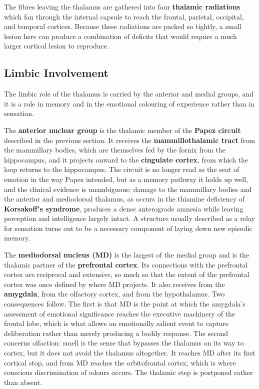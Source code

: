 \documentclass[11pt]{article}
\begin{document}
The fibres leaving the thalamus are gathered into four \textbf{thalamic radiations} which fan through the internal capsule to reach the frontal, parietal, occipital, and temporal cortices. Because these radiations are packed so tightly, a small lesion here can produce a combination of deficits that would require a much larger cortical lesion to reproduce.

\subsection{Limbic Involvement}

The limbic role of the thalamus is carried by the anterior and medial groups, and it is a role in memory and in the emotional colouring of experience rather than in sensation.

The \textbf{anterior nuclear group} is the thalamic member of the \textbf{Papez circuit} described in the previous section. It receives the \textbf{mammillothalamic tract} from the mammillary bodies, which are themselves fed by the fornix from the hippocampus, and it projects onward to the \textbf{cingulate cortex}, from which the loop returns to the hippocampus. The circuit is no longer read as the seat of emotion in the way Papez intended, but as a memory pathway it holds up well, and the clinical evidence is unambiguous: damage to the mammillary bodies and the anterior and mediodorsal thalamus, as occurs in the thiamine deficiency of \textbf{Korsakoff's syndrome}, produces a dense anterograde amnesia while leaving perception and intelligence largely intact. A structure usually described as a relay for sensation turns out to be a necessary component of laying down new episodic memory.

The \textbf{mediodorsal nucleus (MD)} is the largest of the medial group and is the thalamic partner of the \textbf{prefrontal cortex}. Its connections with the prefrontal cortex are reciprocal and extensive, so much so that the extent of the prefrontal cortex was once defined by where MD projects. It also receives from the \textbf{amygdala}, from the olfactory cortex, and from the hypothalamus. Two consequences follow. The first is that MD is the point at which the amygdala's assessment of emotional significance reaches the executive machinery of the frontal lobe, which is what allows an emotionally salient event to capture deliberation rather than merely producing a bodily response. The second concerns olfaction: smell is the sense that bypasses the thalamus on its way to cortex, but it does not avoid the thalamus altogether. It reaches MD after its first cortical stop, and from MD reaches the orbitofrontal cortex, which is where conscious discrimination of odours occurs. The thalamic step is postponed rather than absent.
\end{document}
